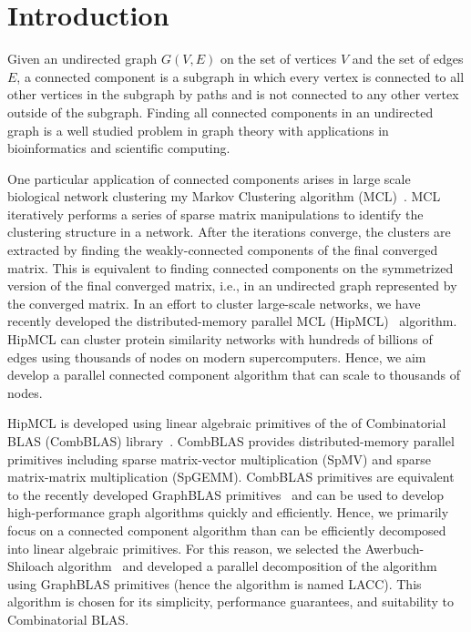 \section{Introduction}
Given an undirected graph $G(V, E)$ on the set of vertices $V$ and the set of edges $E$, a connected component is a subgraph in which every vertex is connected to all other vertices in the subgraph by paths and is not connected to any other vertex outside of the subgraph.  
Finding all connected components in an undirected graph is a well studied problem in graph theory with applications in bioinformatics and scientific computing. 

One particular application of connected components arises in large scale biological network clustering my Markov Clustering algorithm (MCL)~\cite{van2000graph}. 
MCL iteratively performs a series of sparse matrix manipulations to identify the clustering structure in a network. 
After the iterations converge, the clusters are extracted by finding the weakly-connected components of the final converged matrix.  This is equivalent to finding connected components on the symmetrized version of the final converged matrix, i.e., in an undirected graph represented by the converged matrix. 
In an effort to cluster large-scale networks, we have recently developed the distributed-memory parallel MCL (HipMCL)~\cite{hipmcl} algorithm.
HipMCL can cluster protein similarity networks with hundreds of billions of edges using thousands of nodes on modern supercomputers. 
Hence, we aim develop a parallel connected component algorithm that can scale to thousands of nodes. 

HipMCL is developed using linear algebraic primitives of the of Combinatorial BLAS (CombBLAS) library~\cite{bulucc2011combinatorial}. 
CombBLAS provides distributed-memory parallel primitives including sparse matrix-vector multiplication (SpMV) and sparse matrix-matrix multiplication (SpGEMM). 
CombBLAS primitives are equivalent to the recently developed GraphBLAS primitives~\cite{bulucc2017design} and can be used to develop high-performance graph algorithms quickly and efficiently. 
Hence, we primarily focus on a connected component algorithm than can be efficiently decomposed into linear algebraic primitives. 
For this reason, we selected the Awerbuch-Shiloach algorithm~\cite{awerbuch1987new} and developed a parallel decomposition of the algorithm using GraphBLAS primitives (hence the algorithm is named LACC). This algorithm is chosen for its simplicity, performance guarantees, and suitability to Combinatorial BLAS. 





